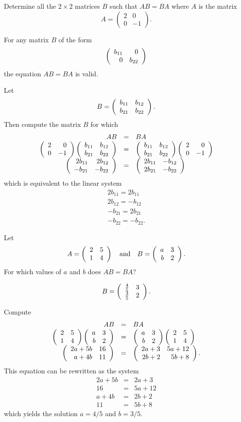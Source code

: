 \documentclass{ximera}
\begin{document}
\begin{exercise} \label{c4.6.1}
Determine all the $2\times 2$ matrices $B$ such that $AB=BA$
where $A$ is the matrix
\[
A=\left(\begin{array}{rr} 2 & 0 \\ 0 & -1 \end{array}\right).
\]

\begin{solution}

\ans For any matrix $B$ of the form
\[
\left(\begin{array}{rr} b_{11} & 0\\ 0 &b_{22}\end{array}\right)
\]
the equation $AB = BA$ is valid.

\soln Let
\[
B = \left(\begin{array}{rr} b_{11} & b_{12}\\ b_{21} &b_{22}\end{array}\right).
\]
Then compute the matrix $B$ for which
\[
\begin{array}{rcl}
AB & = & BA \\
\left(\begin{array}{rr} 2 & 0\\ 0 &-1\end{array}\right)\left(\begin{array}{rr} b_{11} & b_{12}\\ b_{21} &b_{22}\end{array}\right) &
= & \left(\begin{array}{rr} b_{11} & b_{12}\\ b_{21} &b_{22}\end{array}\right)\left(\begin{array}{rr} 2 & 0\\ 0 &-1\end{array}\right) \\
\left(\begin{array}{rr} 2b_{11} & 2b_{12}\\ -b_{21} &-b_{22}\end{array}\right) & = &
\left(\begin{array}{rr} 2b_{11} & -b_{12}\\ 2b_{21} &-b_{22}\end{array}\right) \end{array}
\]
which is equivalent to the linear system
\[
\begin{array}{l}
2b_{11} = 2b_{11} \\
2b_{12} = -b_{12} \\
-b_{21} = 2b_{21} \\
-b_{22} = -b_{22}. \end{array}
\]

\end{solution}
\end{exercise}

\begin{exercise} \label{c4.6.2}
Let
\[
A=\left(\begin{array}{rr} 2 & 5\\ 1 &4\end{array}\right) \quad\mbox{and}\quad B=\left(\begin{array}{rr} a & 3\\ b &2\end{array}\right).
\]
For which values of $a$ and $b$ does $AB=BA$?

\begin{solution}

\ans 
\[
B = \left(\begin{array}{rr} \frac{4}{5} & 3\\ \frac{3}{5} &2\end{array}\right).
\]

\soln Compute
\[
\begin{array}{rcl}
AB & = & BA \\
\left(\begin{array}{rr} 2 & 5\\ 1 &4\end{array}\right)\left(\begin{array}{rr} a & 3\\ b &2\end{array}\right) & = &
\left(\begin{array}{rr} a & 3\\ b &2\end{array}\right)\left(\begin{array}{rr} 2 & 5\\ 1 &4\end{array}\right) \\
\left(\begin{array}{rr} 2a+5b & 16\\ a+4b &11\end{array}\right) & = & \left(\begin{array}{rr} 2a+3 & 5a+12\\ 2b+2 &5b+8\end{array}\right).
\end{array}
\]
This equation can be rewritten as the system
\[
\begin{array}{rcl}
2a + 5b & = & 2a + 3 \\
16 & = & 5a + 12 \\
a + 4b & = & 2b + 2 \\
11 & = & 5b + 8 \end{array}
\]
which yields the solution $a = 4/5$ and $b = 3/5$.

\end{solution}
\end{exercise}
\end{document}
